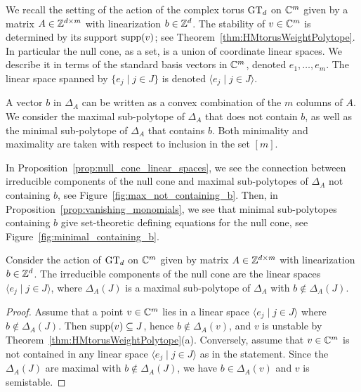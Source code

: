 We recall the setting of the action of the complex torus $\operatorname{GT}_d$ on $\mathbb C^m$ given by a matrix $A \in \mathbb Z^{d \times m}$ with linearization $b \in \mathbb Z^d$. The stability of $v \in \mathbb C^m$ is determined by its support $\operatorname{supp}(v)$; see Theorem~\ref{thm:HMtorusWeightPolytope}. In particular the null cone, as a set, is a union of coordinate linear spaces. 
We describe it in terms of the standard basis vectors in $\mathbb C^m$, denoted $e_1, \ldots, e_m$.
The linear space spanned by $\{ e_j \mid j \in J \}$ is denoted $\langle e_j \mid j \in J \rangle$. 

A vector $b$ in $\Delta_A$ can be written as a convex combination of the $m$ columns of $A$. We consider the maximal sub-polytope of $\Delta_A$ that does not contain $b$, as well as the minimal sub-polytope of $\Delta_A$ that contains $b$. Both minimality and maximality are taken with respect to inclusion in the set $[m]$.

In Proposition~\ref{prop:null_cone_linear_spaces}, we see the connection between irreducible components of the null cone and maximal sub-polytopes of $\Delta_A$ not containing $b$, see Figure~\ref{fig:max_not_containing_b}. Then, in Proposition~\ref{prop:vanishing_monomials}, we see that minimal sub-polytopes containing $b$ give set-theoretic defining equations for the null cone, see Figure~\ref{fig:minimal_containing_b}.

\begin{prop}
	\label{prop:null_cone_linear_spaces}
	Consider the action of $\operatorname{GT}_d$ on $\mathbb C^m$ given by matrix $A \in \mathbb Z^{d \times m}$ with linearization $b \in \mathbb Z^d$. 
	The irreducible components of the null cone are the linear spaces 
	$\langle e_j \mid j \in J \rangle$, where $\Delta_A(J)$ is a maximal sub-polytope of $\Delta_A$ with $b \notin \Delta_A(J)$.
\end{prop}

\begin{proof}
	Assume that a point $v \in \mathbb C^m$ lies in a linear space $\langle e_j \mid j \in J \rangle$ where $b \notin \Delta_A(J)$. Then $\operatorname{supp}(v) \subseteq J$, hence $b \notin \Delta_A(v)$, and $v$ is unstable by Theorem~\ref{thm:HMtorusWeightPolytope}(a). Conversely, assume that $v \in \mathbb C^m$ is not contained in any linear space $\langle e_j \mid j \in J \rangle$ as in the statement. Since the $\Delta_A(J)$ are maximal with $b \notin \Delta_A(J)$, we have $b \in \Delta_A(v)$ and $v$ is semistable.
\end{proof}

